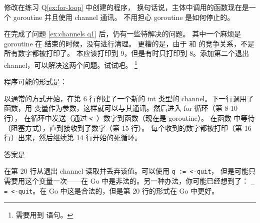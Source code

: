 \begin{Exercise}[title={Channel},difficulty=1]
\label{ex:channels}
\Question\label{ex:channels q1} 修改在练习 Q\ref{ex:for-loop} 中创建的程序，
换句话说，主体中调用的函数现在是一个 goroutine 并且使用 channel 通讯。
不用担心 goroutine 是如何停止的。

\Question\label{ex:channels q2} 在完成了问题 \ref{ex:channels q1} 后，仍有一些待解决的问题。
其中一个麻烦是 goroutine 在  结束的时候，没有进行清理。
更糟的是，由于  和  的竞争关系，不是所有数字都被打印了。
本应该打印到 9，但是有时只打印到 8。添加第二个退出 channel，可以解决这两个问题。试试吧。
\footnote{需要用到  语句。}

\end{Exercise}

\begin{Answer}
\Question 程序可能的形式是： 

以通常的方式开始，在第 6 行创建了一个新的 int 类型的 channel。下一行调用了
 函数，用  变量作为参数，这样就可以与其通讯。然后进入 for 循环（第 8-10 行），
在循环中发送（通过 \lstinline{<-}）数字到函数（现在是 goroutine）。
在函数  中等待（阻塞方式），直到接收到了数字（第 15 行）。
每个收到的数字都被打印（第 16 行）出来，然后继续第 14 行开始的死循环。

\Question 答案是

在第 20 行从退出 channel 读取并丢弃该值。可以使用 \lstinline{q := <-quit}，
但是可能只需要用这个变量一次——在 Go 中是非法的。另一种办法，你可能已经想到了：
\lstinline{_ = <-quit}。在 Go 中这是合法的，但是第 20 行的形式在 Go 中更好。
\end{Answer}

